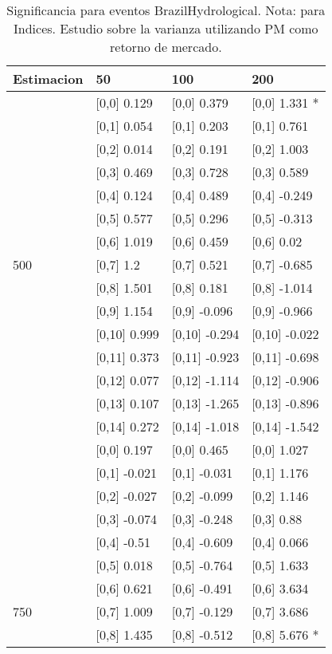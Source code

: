 \begin{table}

\caption{Significancia para eventos BrazilHydrological. Nota: para Indices. Estudio sobre la varianza utilizando PM como retorno de mercado.}
\centering
\begin{tabular}[t]{llll}
\toprule
Estimacion & 50 & 100 & 200\\
\midrule
 & {}[0,0] 0.129 & {}[0,0] 0.379 & {}[0,0] 1.331 *\\
 & {}[0,1] 0.054 & {}[0,1] 0.203 & {}[0,1] 0.761\\
 & {}[0,2] 0.014 & {}[0,2] 0.191 & {}[0,2] 1.003\\
 & {}[0,3] 0.469 & {}[0,3] 0.728 & {}[0,3] 0.589\\
 & {}[0,4] 0.124 & {}[0,4] 0.489 & {}[0,4] -0.249\\
\addlinespace
 & {}[0,5] 0.577 & {}[0,5] 0.296 & {}[0,5] -0.313\\
 & {}[0,6] 1.019 & {}[0,6] 0.459 & {}[0,6] 0.02\\
500 & {}[0,7] 1.2 & {}[0,7] 0.521 & {}[0,7] -0.685\\
 & {}[0,8] 1.501 & {}[0,8] 0.181 & {}[0,8] -1.014\\
 & {}[0,9] 1.154 & {}[0,9] -0.096 & {}[0,9] -0.966\\
\addlinespace
 & {}[0,10] 0.999 & {}[0,10] -0.294 & {}[0,10] -0.022\\
 & {}[0,11] 0.373 & {}[0,11] -0.923 & {}[0,11] -0.698\\
 & {}[0,12] 0.077 & {}[0,12] -1.114 & {}[0,12] -0.906\\
 & {}[0,13] 0.107 & {}[0,13] -1.265 & {}[0,13] -0.896\\
 & {}[0,14] 0.272 & {}[0,14] -1.018 & {}[0,14] -1.542\\
\addlinespace
 & {}[0,0] 0.197 & {}[0,0] 0.465 & {}[0,0] 1.027\\
 & {}[0,1] -0.021 & {}[0,1] -0.031 & {}[0,1] 1.176\\
 & {}[0,2] -0.027 & {}[0,2] -0.099 & {}[0,2] 1.146\\
 & {}[0,3] -0.074 & {}[0,3] -0.248 & {}[0,3] 0.88\\
 & {}[0,4] -0.51 & {}[0,4] -0.609 & {}[0,4] 0.066\\
\addlinespace
 & {}[0,5] 0.018 & {}[0,5] -0.764 & {}[0,5] 1.633\\
 & {}[0,6] 0.621 & {}[0,6] -0.491 & {}[0,6] 3.634\\
750 & {}[0,7] 1.009 & {}[0,7] -0.129 & {}[0,7] 3.686\\
 & {}[0,8] 1.435 & {}[0,8] -0.512 & {}[0,8] 5.676 *\\

\end{tabular}
\end{table}
